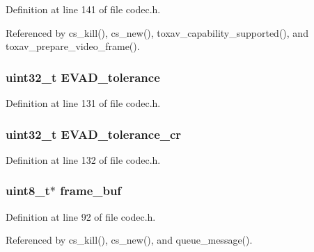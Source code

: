 Definition at line 141 of file codec.\+h.



Referenced by cs\+\_\+kill(), cs\+\_\+new(), toxav\+\_\+capability\+\_\+supported(), and toxav\+\_\+prepare\+\_\+video\+\_\+frame().

\hypertarget{struct___c_s_session_a7d48e69ed8663d4dbe8266ff4158a321}{
\subsubsection[{E\+V\+A\+D\+\_\+tolerance}]{\setlength{\rightskip}{0pt plus 5cm}uint32\+\_\+t E\+V\+A\+D\+\_\+tolerance}}\label{struct___c_s_session_a7d48e69ed8663d4dbe8266ff4158a321}


Definition at line 131 of file codec.\+h.

\hypertarget{struct___c_s_session_aa799246d78fac3297846637588131763}{
\subsubsection[{E\+V\+A\+D\+\_\+tolerance\+\_\+cr}]{\setlength{\rightskip}{0pt plus 5cm}uint32\+\_\+t E\+V\+A\+D\+\_\+tolerance\+\_\+cr}}\label{struct___c_s_session_aa799246d78fac3297846637588131763}


Definition at line 132 of file codec.\+h.

\hypertarget{struct___c_s_session_aa4046ccf60d85f4f486ae0b24e3347f5}{
\subsubsection[{frame\+\_\+buf}]{\setlength{\rightskip}{0pt plus 5cm}uint8\+\_\+t$\ast$ frame\+\_\+buf}}\label{struct___c_s_session_aa4046ccf60d85f4f486ae0b24e3347f5}


Definition at line 92 of file codec.\+h.



Referenced by cs\+\_\+kill(), cs\+\_\+new(), and queue\+\_\+message().

